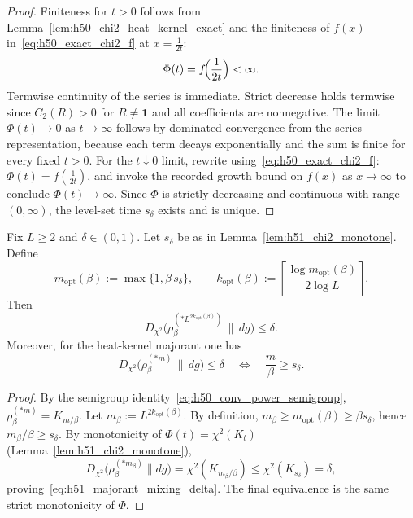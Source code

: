 \begin{proof}
Finiteness for $t>0$ follows from Lemma~\ref{lem:h50_chi2_heat_kernel_exact} and the finiteness of
$f(x)$ in~\eqref{eq:h50_exact_chi2_f} at $x=\frac{1}{2t}$:
\[
\Phi(t)=f\!\Bigl(\frac{1}{2t}\Bigr)<\infty.
\]
Termwise continuity of the series is immediate. Strict decrease holds termwise since $C_2(R)>0$ for $R\ne\mathbf 1$
and all coefficients are nonnegative.
The limit $\Phi(t)\to 0$ as $t\to\infty$ follows by dominated convergence from the series representation, because each term decays exponentially
and the sum is finite for every fixed $t>0$.
For the $t\downarrow 0$ limit, rewrite using~\eqref{eq:h50_exact_chi2_f}:
$\Phi(t)=f(\frac{1}{2t})$, and invoke the recorded growth bound on $f(x)$ as $x\to\infty$ to conclude $\Phi(t)\to\infty$.
Since $\Phi$ is strictly decreasing and continuous with range $(0,\infty)$, the level-set time $s_\delta$ exists and is unique.
\end{proof}

\begin{proposition}\label{prop:h51_kbeta_opt}
Fix $L\ge 2$ and $\delta\in(0,1)$.
Let $s_\delta$ be as in Lemma~\ref{lem:h51_chi2_monotone}.
Define
\begin{equation}\label{eq:h51_kbeta_opt_def}
m_{\mathrm{opt}}(\beta):=\max\{1,\beta\,s_\delta\},
\qquad
k_{\mathrm{opt}}(\beta):=\left\lceil \frac{\log m_{\mathrm{opt}}(\beta)}{2\log L}\right\rceil.
\end{equation}
Then
\begin{equation}\label{eq:h51_majorant_mixing_delta}
D_{\chi^2}\!\bigl(\rho_\beta^{(*L^{2k_{\mathrm{opt}}(\beta)})}\,\|\,dg\bigr)\le \delta.
\end{equation}
Moreover, for the heat-kernel majorant one has
\[
D_{\chi^2}\!\bigl(\rho_\beta^{(*m)}\,\|\,dg\bigr)\le \delta
\quad\Longleftrightarrow\quad
\frac{m}{\beta}\ge s_\delta.
\]
\end{proposition}

\begin{proof}
By the semigroup identity~\eqref{eq:h50_conv_power_semigroup}, $\rho_\beta^{(*m)}=K_{m/\beta}$.
Let $m_\beta:=L^{2k_{\mathrm{opt}}(\beta)}$. By definition, $m_\beta\ge m_{\mathrm{opt}}(\beta)\ge \beta s_\delta$, hence $m_\beta/\beta\ge s_\delta$.
By monotonicity of $\Phi(t)=\chi^2(K_t)$ (Lemma~\ref{lem:h51_chi2_monotone}),
\[
D_{\chi^2}\!\bigl(\rho_\beta^{(*m_\beta)}\|dg\bigr)
=\chi^2(K_{m_\beta/\beta})
\le \chi^2(K_{s_\delta})
=\delta,
\]
proving~\eqref{eq:h51_majorant_mixing_delta}.
The final equivalence is the same strict monotonicity of $\Phi$.
\end{proof}

